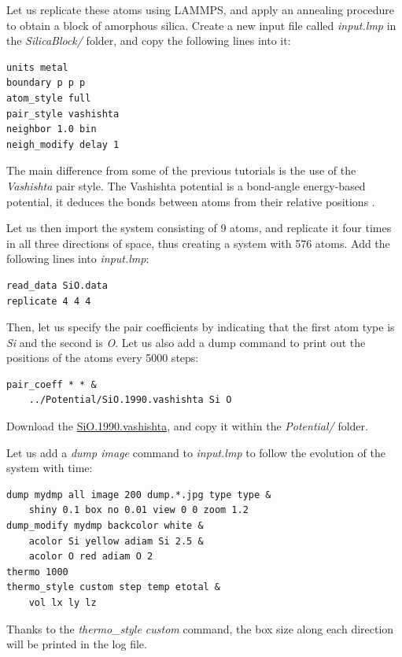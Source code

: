 \documentclass[9pt,tutorial]{livecoms}
\begin{document}
Let us replicate these atoms using LAMMPS, and apply an annealing procedure to
obtain a block of amorphous silica. Create a new input file called \textit{input.lmp}
in the \textit{SilicaBlock/} folder, and copy
the following lines into it:
\begin{lstlisting}
units metal
boundary p p p
atom_style full
pair_style vashishta
neighbor 1.0 bin
neigh_modify delay 1
\end{lstlisting}
The main difference from some of the previous tutorials is the use of the \textit{Vashishta}
pair style. The Vashishta potential is a bond-angle energy-based potential, it deduces
the bonds between atoms from their relative positions \cite{vashishta1990interaction}.

Let us then import the system consisting of 9 atoms, and replicate it four times
in all three directions of space, thus creating a system with 576 atoms. Add the
following lines into \textit{input.lmp}:
\begin{lstlisting}
read_data SiO.data
replicate 4 4 4
\end{lstlisting}
Then, let us specify the pair coefficients by indicating that the first atom type
is \textit{Si} and the second is \textit{O}. Let us also add a dump command to
print out the positions of the atoms every 5000 steps:
\begin{lstlisting}
pair_coeff * * &
    ../Potential/SiO.1990.vashishta Si O
\end{lstlisting}
Download the \href{https://raw.githubusercontent.com/lammpstutorials/lammpstutorials-article/main/files/tutorial6/SiO.1990.vashishta}{SiO.1990.vashishta},
and copy it within the \textit{Potential/} folder.

Let us add a \textit{dump image} command to \textit{input.lmp} to follow the
evolution of the system with time:
\begin{lstlisting}
dump mydmp all image 200 dump.*.jpg type type &
    shiny 0.1 box no 0.01 view 0 0 zoom 1.2
dump_modify mydmp backcolor white &
    acolor Si yellow adiam Si 2.5 &
    acolor O red adiam O 2
thermo 1000
thermo_style custom step temp etotal &
    vol lx ly lz
\end{lstlisting}
Thanks to the \textit{thermo\_style custom} command, the box size along each direction
will be printed in the log file.
\end{document}

